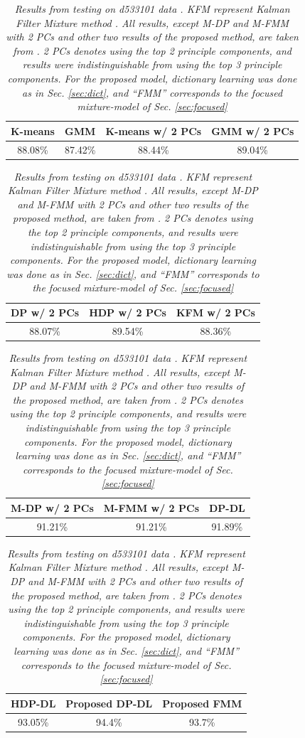 \documentclass[journal]{IEEEtran}
\begin{document}
\begin{table}[t] \caption{\textit{\small{\label{table:HC1} Results from testing on d533101 data \cite{Henze2000}. KFM represent Kalman Filter
Mixture method \cite{Calabrese2010}. All results, except M-DP and M-FMM with 2 PCs and other two results of the proposed method, are taken from \cite{Bo2011}.  2 PCs denotes using the top 2 principle components, and results were indistinguishable from using the top 3 principle components. For the proposed model, dictionary learning was done as in Sec. \ref{sec:dict}, and ``FMM'' corresponds to the focused mixture-model of Sec. \ref{sec:focused}}}}



\begin{center}
\begin{tabular}{|c|c|c|c|}
\hline K-means & GMM & K-means w/ 2 PCs & GMM w/ 2 PCs   \\
\hline
88.08\% & 87.42\% &  88.44\% & 89.04\%   \\
\hline
\end{tabular}
\begin{tabular}{|c|c|c|}
\hline  DP w/ 2 PCs & HDP w/ 2 PCs & KFM w/ 2 PCs    \\
\hline
     88.07\% & 89.54\% & 88.36\% \\
\hline
\end{tabular}
\begin{tabular}{|c|c|c|}
\hline  M-DP w/ 2 PCs &  M-FMM w/ 2 PCs & DP-DL    \\
\hline
      91.21\%  & 91.21\% & 91.89\% \\
\hline
\end{tabular}
\begin{tabular}{|c|c|c|}
\hline  HDP-DL &  Proposed DP-DL &  Proposed FMM\\
\hline
  93.05\% & 94.4\%  & 93.7\%\\
\hline
\end{tabular}\end{center}
\end{table}
\end{document}
